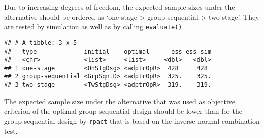 \documentclass[]{book}
\newenvironment{Shaded}{\begin{snugshade}}{\end{snugshade}}
\newcommand{\CommentTok}[1]{\textcolor[rgb]{0.56,0.35,0.01}{\textit{#1}}}
\newcommand{\DataTypeTok}[1]{\textcolor[rgb]{0.13,0.29,0.53}{#1}}
\newcommand{\DecValTok}[1]{\textcolor[rgb]{0.00,0.00,0.81}{#1}}
\newcommand{\FloatTok}[1]{\textcolor[rgb]{0.00,0.00,0.81}{#1}}
\newcommand{\KeywordTok}[1]{\textcolor[rgb]{0.13,0.29,0.53}{\textbf{#1}}}
\newcommand{\NormalTok}[1]{#1}
\newcommand{\OperatorTok}[1]{\textcolor[rgb]{0.81,0.36,0.00}{\textbf{#1}}}
\newcommand{\StringTok}[1]{\textcolor[rgb]{0.31,0.60,0.02}{#1}}
\begin{document}
Due to increasing degrees of freedom, the expected sample sizes under the
alternative should be ordered as `one-stage \textgreater{} group-sequential \textgreater{} two-stage'.
They are tested by simulation as well as by calling \texttt{evaluate()}.

\begin{Shaded}
\end{Shaded}

\begin{verbatim}
## # A tibble: 3 x 5
##   type             initial    optimal      ess ess_sim
##   <chr>            <list>     <list>     <dbl>   <dbl>
## 1 one-stage        <OnStgDsg> <adptrOpR>  428     428 
## 2 group-sequential <GrpSqntD> <adptrOpR>  325.    325.
## 3 two-stage        <TwStgDsg> <adptrOpR>  319.    319.
\end{verbatim}

The expected sample size under the alternative that was used as objective criterion
of the optimal group-sequential design should be lower than for the
group-sequential design by \texttt{rpact} that is based on the inverse normal
combination test.
\end{document}
